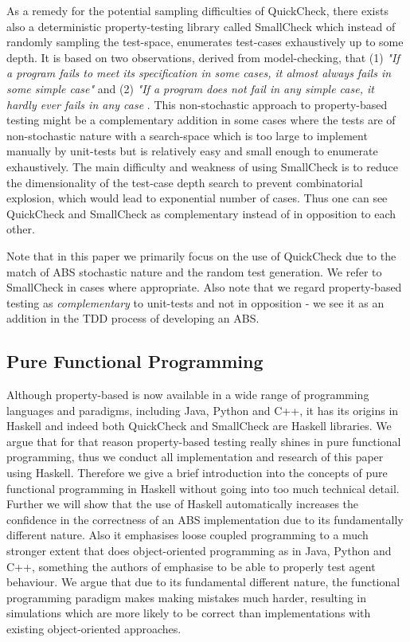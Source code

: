 As a remedy for the potential sampling difficulties of QuickCheck, there exists also a deterministic property-testing library called SmallCheck \cite{runciman_smallcheck_2008} which instead of randomly sampling the test-space, enumerates test-cases exhaustively up to some depth. It is based on two observations, derived from model-checking, that (1) \textit{"If a program fails to meet its specification in some cases, it almost always fails in some simple case"} and (2) \textit{"If a program does not fail in any simple case, it hardly ever fails in any case} \cite{runciman_smallcheck_2008}. This non-stochastic approach to property-based testing might be a complementary addition in some cases where the tests are of non-stochastic nature with a search-space which is too large to implement manually by unit-tests but is relatively easy and small enough to enumerate exhaustively. The main difficulty and weakness of using SmallCheck is to reduce the dimensionality of the test-case depth search to prevent combinatorial explosion, which would lead to exponential number of cases. Thus one can see QuickCheck and SmallCheck as complementary instead of in opposition to each other.

Note that in this paper we primarily focus on the use of QuickCheck due to the match of ABS stochastic nature and the random test generation. We refer to SmallCheck in cases where appropriate. Also note that we regard property-based testing as \textit{complementary} to unit-tests and not in opposition - we see it as an addition in the TDD process of developing an ABS.

\subsection{Pure Functional Programming}
Although property-based is now available in a wide range of programming languages and paradigms, including Java, Python and C++, it has its origins in Haskell and indeed both QuickCheck and SmallCheck are Haskell libraries. We argue that for that reason property-based testing really shines in pure functional programming, thus we conduct all implementation and research of this paper using Haskell. Therefore we give a brief introduction into the concepts of pure functional programming in Haskell without going into too much technical detail. Further we will show that the use of Haskell automatically increases the confidence in the correctness of an ABS implementation due to its fundamentally different nature. Also it emphasises loose coupled programming to a much stronger extent that does object-oriented programming as in Java, Python and C++, something the authors of \cite{collier_test-driven_2013} emphasise to be able to properly test agent behaviour. We argue that due to its fundamental different nature, the functional programming paradigm makes making mistakes much harder, resulting in simulations which are more likely to be correct than implementations with existing object-oriented approaches.

